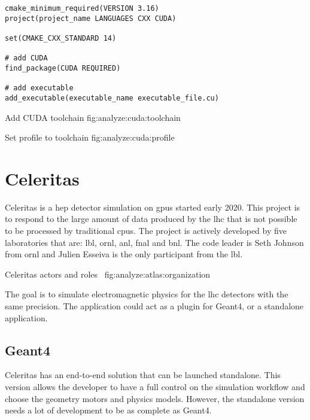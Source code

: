 \begin{code}
    \label{code:analyze:cuda:create_project}
    \begin{verbatim}
cmake_minimum_required(VERSION 3.16)
project(project_name LANGUAGES CXX CUDA)

set(CMAKE_CXX_STANDARD 14)

# add CUDA
find_package(CUDA REQUIRED)

# add executable
add_executable(executable_name executable_file.cu)
    \end{verbatim}
\end{code}

{Add CUDA toolchain}
{fig:analyze:cuda:toolchain}

{Set profile to toolchain}
{fig:analyze:cuda:profile}



\section{Celeritas}
\label{ch:analyze:atlas}

Celeritas is a \acrfull{hep} detector simulation on \acrshort{gpu}s started
early 2020.
This project is to respond to the large amount of data produced by the
\acrfull{lhc} that is not possible to be processed by traditional
\acrshort{cpu}s.
The project is actively developed by five laboratories that are: \acrfull{lbl},
\acrfull{ornl}, \acrfull{anl}, \acrfull{fnal} and \acrfull{bnl}.
The code leader is Seth Johnson from \acrshort{ornl} and Julien Esseiva is the only
participant from the \acrshort{lbl}.

{Celeritas actors and roles~\cite{celeritas-presentation-johnson}}
{fig:analyze:atlas:organization}

The goal is to simulate electromagnetic physics for the \acrshort{lhc} detectors
with the same precision.
The application could act as a plugin for Geant4, or a standalone application.


\subsection{Geant4}
\label{ch:analyze:atlas:geant4}

Celeritas has an end-to-end solution that can be launched standalone.
This version allows the developer to have a full control on the simulation
workflow and choose the geometry motors and physics models.
However, the standalone version needs a lot of development to be as complete as
Geant4.

